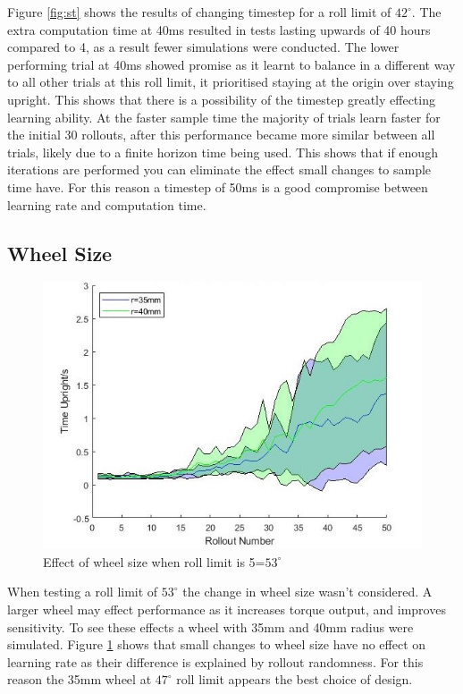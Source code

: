 \documentclass[twoside,twocolumn,12pt]{article}
\begin{document}
Figure \ref{fig:st} shows the results of changing timestep for a roll limit of $42^{\circ}$. The extra computation time at 40ms resulted in tests lasting upwards of 40 hours compared to 4, as a result fewer simulations were conducted. The lower performing trial at 40ms showed promise as it learnt to balance in a different way to all other trials at this roll limit, it prioritised staying at the origin over staying upright. This shows that there is a possibility of the timestep greatly effecting learning ability. At the faster sample time the majority of trials learn faster for the initial 30 rollouts, after this performance became more similar between all trials, likely due to a finite horizon time being used. This shows that if enough iterations are performed you can eliminate the effect small changes to sample time have. For this reason a timestep of 50ms is a good compromise between learning rate and computation time.
\subsection{Wheel Size}
\begin{figure}[h]
  \centering
    \includegraphics[width=\linewidth]{disp_wheel}
  \caption{Effect of wheel size when roll limit is 5=$53^{\circ}$}
  \label{fig:whellsi}
\end{figure}
When testing a roll limit of $53^{\circ}$ the change in wheel size wasn't considered. A larger wheel may effect performance as it increases torque output, and improves sensitivity. To see these effects a wheel with 35mm  and 40mm radius were simulated. Figure \ref{fig:whellsi} shows that small changes to wheel size have no effect on learning rate as their difference is explained by rollout randomness. For this reason the 35mm wheel at $47^{\circ}$  roll limit appears the best choice of design.
\end{document}
